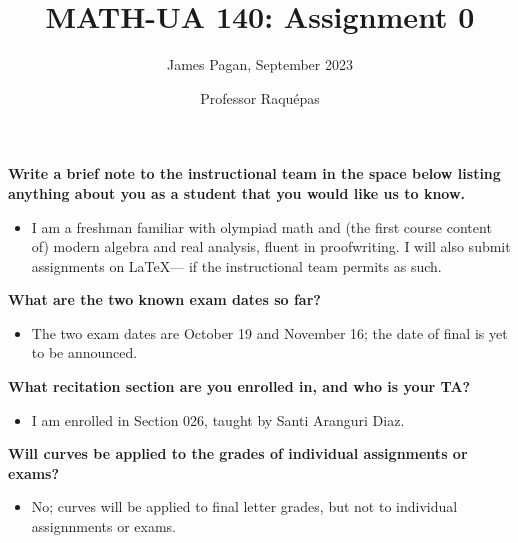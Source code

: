 \documentclass[11pt]{article}
\title{MATH-UA 140: Assignment 0}
\author{James Pagan, September 2023}
\date{Professor Raquépas}
\begin{document}
\maketitle


\textbf{Write a brief note to the instructional team in the space below listing anything about you as a student that you would like us to know.}

\begin{itemize}
	\item I am a freshman familiar with olympiad math and (the first course content of) modern algebra and real analysis, fluent in proofwriting. I will also submit assignments on \LaTeX --- if the instructional team permits as such. 
\end{itemize}

\textbf{What are the two known exam dates so far?}

\begin{itemize}
	\item The two exam dates are October 19 and November 16; the date of final is yet to be announced.
\end{itemize}

\textbf{What recitation section are you enrolled in, and who is your TA?}

\begin{itemize}
	\item I am enrolled in Section 026, taught by Santi Aranguri Diaz.
\end{itemize}

\textbf{Will curves be applied to the grades of individual assignments or exams?}

\begin{itemize}
	\item No; curves will be applied to final letter grades, but not to individual assignnments or exams.
\end{itemize}
\end{document}
